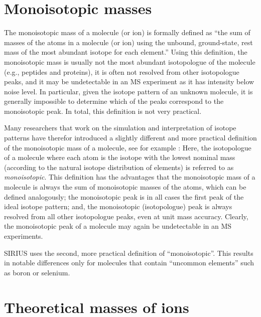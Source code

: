 \documentclass[letterpaper,10pt,openany,oneside]{sphinxmanual}
\begin{document}

\section{Monoisotopic masses}

The monoisotopic mass of a molecule (or ion) is formally defined as ``the sum
of masses of the atoms in a molecule (or ion) using the unbound,
ground-state, rest mass of the most abundant isotope for each element.''
Using this definition, the monoisotopic mass is usually not the most abundant
isotopologue of the molecule (e.g., peptides and proteins), it is often not
resolved from other isotopologue peaks, and it may be undetectable in an
MS experiment as it has intensity below noise level.  In particular, given
the isotope pattern of an unknown molecule, it is generally impossible to
determine which of the peaks correspond to the monoisotopic peak.  In total,
this definition is not very practical.

Many researchers that work on the simulation and interpretation of isotope
patterns have therefor introduced a slightly different and more practical
definition of the monoisotopic mass of a molecule, see for
example \citet{dittwald15fine, meusel16predicting}: Here, the isotopologue of
a molecule where each atom is the isotope with the lowest nominal mass
(according to the natural isotope distribution of elements) is referred to
as \emph{monoisotopic}.  This definition has the advantages that the
monoisotopic mass of a molecule is always the sum of monoisotopic masses of
the atoms, which can be defined analogously; the monoisotopic peak is in all
cases the first peak of the ideal isotope pattern; and, the monoisotopic
(isotopologue) peak is always resolved from all other isotopologue peaks,
even at unit mass accuracy.  Clearly, the monoisotopic peak of a molecule may
again be undetectable in an MS experiments.

SIRIUS uses the second, more practical definition of ``monoisotopic''.  This
results in notable differences only for molecules that contain ``uncommon
elements'' such as boron or selenium.


\section{Theoretical masses of ions}
\end{document}
